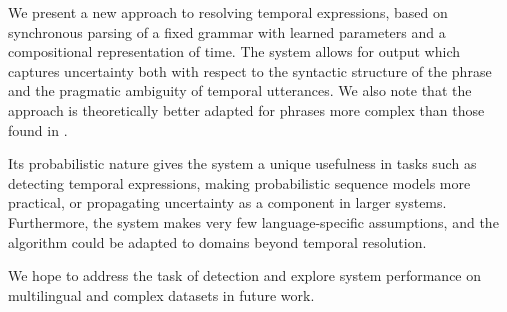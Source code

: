 We present a new approach to resolving temporal expressions,
	based on synchronous parsing of a fixed grammar with learned parameters
	and a compositional representation of time.
The system allows for output which captures uncertainty both with respect to 
	the syntactic structure of the phrase and the pragmatic ambiguity of 
	temporal utterances.
We also note that the approach is theoretically better adapted for
	phrases more complex than those found in \tempeval.

Its probabilistic nature gives the system a unique usefulness
	in tasks such as detecting temporal expressions, making probabilistic
	sequence models more practical, or propagating uncertainty as a
	component in larger systems.
Furthermore, the system makes very few language-specific assumptions,
	and the algorithm could be adapted to domains beyond temporal resolution.

We hope to address the task of detection and explore system performance
	on multilingual and complex datasets in future work.
